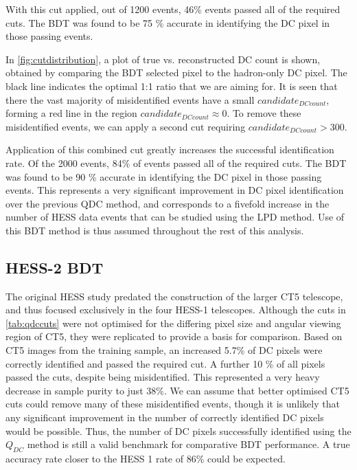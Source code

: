 \documentclass{article}
\begin{document}
With this cut applied, out of 1200 events, 46\% events passed all of the required cuts. The BDT was found to be 75 \% accurate in identifying the DC pixel in those passing events.

In \ref{fig:cutdistribution}, a plot of true vs. reconstructed DC count is shown, obtained by comparing the BDT selected pixel to the hadron-only DC pixel. The black line indicates the optimal 1:1 ratio that we are aiming for. It is seen that there the vast majority of misidentified events have a small $candidate_{DC count}$, forming a red line in the region $candidate_{DC count} \approx 0$. To remove these misidentified events, we can apply a second cut requiring $candidate_{DC count} > 300$.

Application of this combined cut greatly increases the successful identification rate. Of the 2000 events, 84\% of events passed all of the required cuts. The BDT was found to be 90 \% accurate in identifying the DC pixel in those passing events. This represents a very significant improvement in DC pixel identification over the previous QDC method, and corresponds to a fivefold increase in the number of HESS data events that can be studied using the LPD method. Use of this BDT method is thus assumed throughout the rest of this analysis.

\subsection{HESS-2 BDT}
The original HESS study predated the construction of the larger CT5 telescope, and thus focused exclusively in the four HESS-1 telescopes. Although the cuts in \ref{tab:qdccuts} were not optimised for the differing pixel size and angular viewing region of CT5, they were replicated to provide a basis for comparison. Based on CT5 images from the training sample, an increased 5.7\% of DC pixels were correctly identified and passed the required cut. A further 10 \% of all pixels passed the cuts, despite being misidentified. This represented a very heavy decrease in sample purity to just 38\%. We can assume that better optimised CT5 cuts could remove many of these misidentified events, though it is unlikely that any significant improvement in the number of correctly identified DC pixels would be possible. Thus, the number of DC pixels successfully identified using the $Q_{DC}$ method is still a valid benchmark for comparative BDT performance. A true accuracy rate closer to the HESS 1 rate of 86\% could be expected. 
\end{document}
